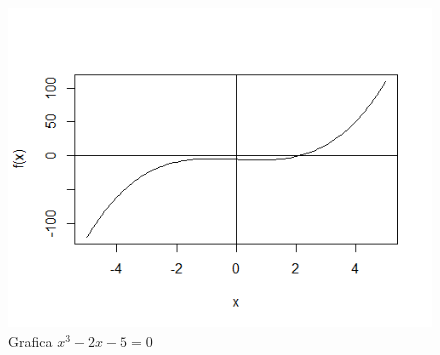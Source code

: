 \documentclass[12pt,a4paper]{article}
\begin{document}
\begin{figure}
	\centering                                         
	\includegraphics[scale = 1.0]{Ec3.png} 
	\caption{Grafica  $x^3-2x-5=0$}            
\end{figure}



\end{document}
